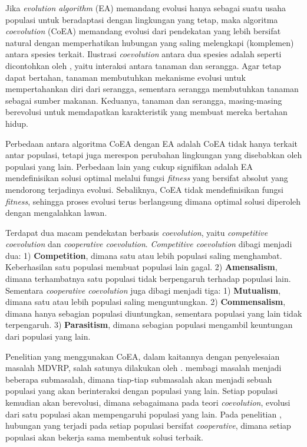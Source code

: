 Jika \textit{evolution algorithm} (EA) memandang evolusi hanya sebagai suatu usaha populasi untuk beradaptasi dengan lingkungan yang tetap, maka algoritma \textit{coevolution} (CoEA) memandang evolusi dari pendekatan yang lebih bersifat natural dengan memperhatikan hubungan yang saling melengkapi (komplemen) antara spesies terkait. Ilustrasi \textit{coevolution} antara dua spesies adalah seperti dicontohkan oleh \citep{holland_echo:_1990}, yaitu interaksi antara tanaman dan serangga. Agar tetap dapat bertahan, tanaman membutuhkan mekanisme evolusi untuk mempertahankan diri dari serangga, sementara serangga membutuhkan tanaman sebagai sumber makanan. Keduanya, tanaman dan serangga, masing-masing berevolusi untuk memdapatkan karakteristik yang membuat mereka bertahan hidup.


Perbedaan antara algoritma CoEA dengan EA adalah CoEA tidak hanya terkait antar populasi, tetapi juga merespon perubahan lingkungan yang disebabkan oleh populasi yang lain. Perbedaan lain yang cukup signifikan adalah EA mendefinisikan solusi optimal melalui fungsi \textit{fitness} yang bersifat absolut yang mendorong terjadinya evolusi. Sebaliknya, CoEA tidak mendefinisikan fungsi \textit{fitness}, sehingga proses evolusi terus berlangsung dimana optimal solusi diperoleh dengan mengalahkan lawan.


Terdapat dua macam pendekatan berbasis \textit{coevolution}, yaitu \textit{competitive coevolution} dan \textit{cooperative coevolution}. \textit{Competitive coevolution} dibagi menjadi dua: 1) \textbf{Competition}, dimana satu atau lebih populasi saling menghambat. Keberhasilan satu populasi membuat populasi lain gagal. 2) \textbf{Amensalism}, dimana terhambatnya satu populasi tidak berpengaruh terhadap populasi lain. Sementara  \textit{cooperative coevolution} juga dibagi menjadi tiga: 1) \textbf{Mutualism}, dimana satu atau lebih populasi saling menguntungkan. 2) \textbf{Commensalism}, dimana hanya sebagian populasi diuntungkan, sementara populasi yang lain tidak terpengaruh. 3) \textbf{Parasitism}, dimana sebagian populasi mengambil keuntungan dari populasi yang lain.


Penelitian yang menggunakan CoEA, dalam kaitannya dengan penyelesaian masalah MDVRP, salah satunya dilakukan oleh \citep{de_oliveira_cooperative_2016}. \citep{de_oliveira_cooperative_2016} membagi masalah menjadi beberapa submasalah, dimana tiap-tiap submasalah akan menjadi sebuah populasi yang akan berinteraksi dengan populasi yang lain. Setiap populasi kemudian akan berevolusi, dimana sebagaimana pada teori \textit{coevolution}, evolusi dari satu populasi akan mempengaruhi populasi yang lain. Pada penelitian \citep{de_oliveira_cooperative_2016}, hubungan yang terjadi pada setiap populasi bersifat \textit{cooperative}, dimana setiap populasi akan bekerja sama membentuk solusi terbaik.


